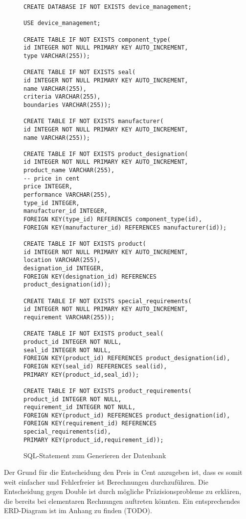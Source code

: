 \documentclass{article}
\begin{document}
\begin{figure}[!h]
\centering
\caption{SQL-Statement zum Generieren der Datenbank}
\begin{lstlisting}
CREATE DATABASE IF NOT EXISTS device_management;

USE device_management;

CREATE TABLE IF NOT EXISTS component_type(
id INTEGER NOT NULL PRIMARY KEY AUTO_INCREMENT, 
type VARCHAR(255));

CREATE TABLE IF NOT EXISTS seal(
id INTEGER NOT NULL PRIMARY KEY AUTO_INCREMENT, 
name VARCHAR(255),
criteria VARCHAR(255),
boundaries VARCHAR(255));

CREATE TABLE IF NOT EXISTS manufacturer(
id INTEGER NOT NULL PRIMARY KEY AUTO_INCREMENT, 
name VARCHAR(255));

CREATE TABLE IF NOT EXISTS product_designation(
id INTEGER NOT NULL PRIMARY KEY AUTO_INCREMENT, 
product_name VARCHAR(255),
-- price in cent
price INTEGER, 
performance VARCHAR(255),
type_id INTEGER,
manufacturer_id INTEGER,
FOREIGN KEY(type_id) REFERENCES component_type(id),
FOREIGN KEY(manufacturer_id) REFERENCES manufacturer(id));

CREATE TABLE IF NOT EXISTS product(
id INTEGER NOT NULL PRIMARY KEY AUTO_INCREMENT, 
location VARCHAR(255),
designation_id INTEGER,
FOREIGN KEY(designation_id) REFERENCES product_designation(id));

CREATE TABLE IF NOT EXISTS special_requirements(
id INTEGER NOT NULL PRIMARY KEY AUTO_INCREMENT, 
requirement VARCHAR(255));

CREATE TABLE IF NOT EXISTS product_seal(
product_id INTEGER NOT NULL, 
seal_id INTEGER NOT NULL,
FOREIGN KEY(product_id) REFERENCES product_designation(id),
FOREIGN KEY(seal_id) REFERENCES seal(id),
PRIMARY KEY(product_id,seal_id));

CREATE TABLE IF NOT EXISTS product_requirements(
product_id INTEGER NOT NULL, 
requirement_id INTEGER NOT NULL,
FOREIGN KEY(product_id) REFERENCES product_designation(id),
FOREIGN KEY(requirement_id) REFERENCES special_requirements(id),
PRIMARY KEY(product_id,requirement_id));
\end{lstlisting}
\end{figure}
Der Grund für die Entscheidung den Preis in Cent anzugeben ist, dass es somit weit einfacher und Fehlerfreier ist Berechnungen durchzuführen. Die Entscheidung gegen Double ist durch mögliche Präzisionsprobleme zu erklären, die bereits bei elementaren Rechnungen auftreten könnten. Ein entsprechendes ERD-Diagram ist im Anhang zu finden (TODO).
\end{document}
